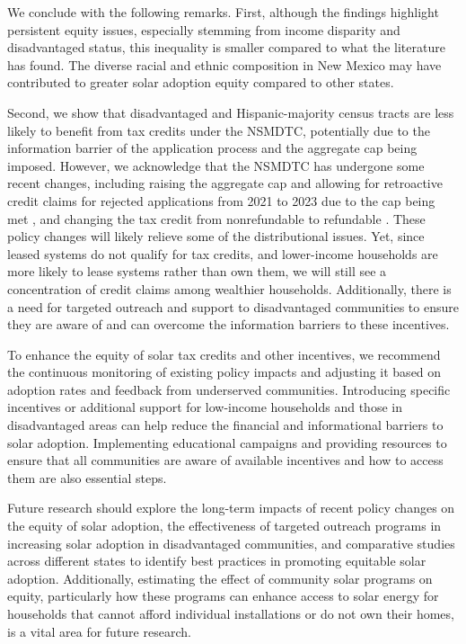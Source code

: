 \documentclass[12pt,twoside,letterpaper]{article}
\begin{document}
We conclude with the following remarks. First, although the findings highlight persistent equity issues, especially stemming from income disparity and disadvantaged status, this inequality is smaller compared to what the literature has found. The diverse racial and ethnic composition in New Mexico may have contributed to greater solar adoption equity compared to other states.

Second, we show that disadvantaged and Hispanic-majority census tracts are less likely to benefit from tax credits under the NSMDTC, potentially due to the information barrier of the application process and the aggregate cap being imposed. However, we acknowledge that the NSMDTC has undergone some recent changes, including raising the aggregate cap and allowing for retroactive credit claims for rejected applications from 2021 to 2023 due to the cap being met \parencite{newsolarcap}, and changing the tax credit from nonrefundable to refundable \parencite{nmsmdtc}. These policy changes will likely relieve some of the distributional issues. Yet, since leased systems do not qualify for tax credits, and lower-income households are more likely to lease systems rather than own them, we will still see a concentration of credit claims among wealthier households. Additionally, there is a need for targeted outreach and support to disadvantaged communities to ensure they are aware of and can overcome the information barriers to these incentives.

To enhance the equity of solar tax credits and other incentives, we recommend the continuous monitoring of existing policy impacts and adjusting it based on adoption rates and feedback from underserved communities. Introducing specific incentives or additional support for low-income households and those in disadvantaged areas can help reduce the financial and informational barriers to solar adoption. Implementing educational campaigns and providing resources to ensure that all communities are aware of available incentives and how to access them are also essential steps. 

Future research should explore the long-term impacts of recent policy changes on the equity of solar adoption, the effectiveness of targeted outreach programs in increasing solar adoption in disadvantaged communities, and comparative studies across different states to identify best practices in promoting equitable solar adoption. Additionally, estimating the effect of community solar programs on equity, particularly how these programs can enhance access to solar energy for households that cannot afford individual installations or do not own their homes, is a vital area for future research.
\end{document}
